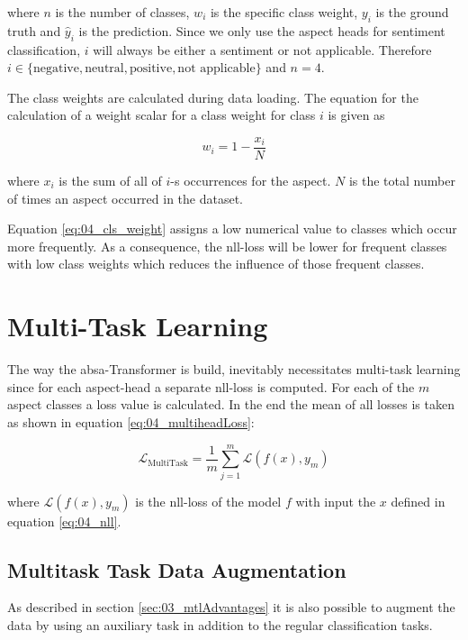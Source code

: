 where $n$ is the number of classes, $w_i$ is the specific class weight, $y_i$ is the ground truth and $\hat{y}_i$ is the prediction. Since we only use the aspect heads for sentiment classification, $i$ will always be either a sentiment or not applicable. Therefore $i \in \{\text{negative}, \text{neutral}, \text{positive}, \text{not applicable\}}$ and $n=4$.
\medskip

The class weights are calculated during data loading. The equation for the calculation of a weight scalar for a class weight for class $i$ is given as

\begin{equation}
	w_i = 1 - \frac{x_i}{N}
\label{eq:04_cls_weight}
\end{equation}

where $x_i$ is the sum of all of $i$-s occurrences for the aspect. $N$ is the total number of times an aspect occurred in the dataset.
\medskip

Equation \ref{eq:04_cls_weight} assigns a low numerical value to classes which occur more frequently. As a consequence, the \gls{nll}-loss will be lower for frequent classes with low class weights which reduces the influence of those frequent classes.  

\section{Multi-Task Learning}
\label{sec:04_multitask}
The way the \gls{absa}-Transformer is build, inevitably necessitates multi-task learning since for each aspect-head a separate \gls{nll}-loss is computed. For each of the $m$ aspect classes a loss value is calculated. In the end the mean of all losses is taken as shown in equation \ref{eq:04_multiheadLoss}:

\begin{equation}
\mathcal{L}_\text{MultiTask} = \frac{1}{m}\sum_{j=1}^{m}\mathcal{L}(f(x), y_m)
\label{eq:04_multiheadLoss}
\end{equation}

where $\mathcal{L}(f(x), y_m)$ is the \gls{nll}-loss of the model $f$ with input the $x$ defined in equation \ref{eq:04_nll}.

\subsection{Multitask Task Data Augmentation}

As described in section \ref{sec:03_mtlAdvantages} it is also possible to augment the data by using an auxiliary task in addition to the regular classification tasks.

